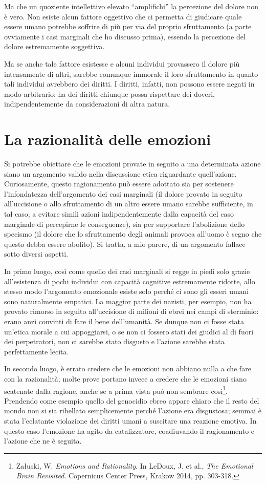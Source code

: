 \documentclass[a4paper,11pt,oneside,article]{memoir}
\begin{document}
Ma che un quoziente intellettivo elevato ``amplifichi'' la percezione del dolore
non è vero. Non esiste alcun fattore oggettivo che ci permetta di giudicare
quale essere umano potrebbe soffrire di più per via del proprio sfruttamento (a
parte ovviamente i casi marginali che ho discusso prima), essendo la percezione
del dolore estremamente soggettiva.

Ma se anche tale fattore esistesse e alcuni individui provassero il dolore più
intensamente di altri, sarebbe comunque immorale il loro sfruttamento in quanto
tali individui avrebbero dei diritti. I diritti, infatti, non possono essere
negati in modo arbitrario: ha dei diritti chiunque possa rispettare dei doveri,
indipendentemente da considerazioni di altra natura.

\section{La razionalità delle emozioni}

Si potrebbe obiettare che le emozioni provate in seguito a una determinata
azione siano un argomento valido nella discussione etica riguardante
quell'azione. Curiosamente, questo ragionamento può essere adottato sia per
sostenere l'infondatezza dell'argomento dei casi marginali (il dolore provato in
seguito all'uccisione o allo sfruttamento di un altro essere umano sarebbe
sufficiente, in tal caso, a evitare simili azioni indipendentemente dalla
capacità del caso marginale di percepirne le conseguenze), sia per supportare
l'abolizione dello specismo (il dolore che lo sfruttamento degli animali provoca
all'uomo è segno che questo debba essere abolito). Si tratta, a mio parere, di
un argomento fallace sotto diversi aspetti.

In primo luogo, così come quello dei casi marginali si regge in piedi solo
grazie all'esistenza di pochi individui con capacità cognitive estremamente
ridotte, allo stesso modo l'argomento emozionale esiste solo perché ci sono gli
esseri umani sono naturalmente empatici. La maggior parte dei nazisti, per
esempio, non ha provato rimorso in seguito all'uccisione di milioni di ebrei nei
campi di sterminio: erano anzi convinti di fare il bene dell'umanità. Se dunque
non ci fosse stata un'etica morale a cui appoggiarsi, o se non ci fossero stati
dei giudici al di fuori dei perpetratori, non ci sarebbe stato disgusto e
l'azione sarebbe stata perfettamente lecita.

In secondo luogo, è errato credere che le emozioni non abbiano nulla a che fare
con la razionalità; molte prove portano invece a credere che le emozioni siano
scatenate dalla ragione, anche se a prima vista può non sembrare
così\footnote{Załuski, W. \emph{Emotions and Rationality}. In LeDoux, J. et al.,
\emph{The Emotional Brain Revisited}. Copernicus Center Press, Krakow 2014, pp.
303-318.}. Prendendo come esempio quello del genocidio ebreo appare chiaro che
il resto del mondo non si sia ribellato semplicemente perché l'azione era
disgustosa; semmai è stata l'eclatante violazione dei diritti umani a suscitare
una reazione emotiva. In questo caso l'emozione ha agito da catalizzatore,
coadiuvando il ragionamento e l'azione che ne è seguita.
\end{document}
